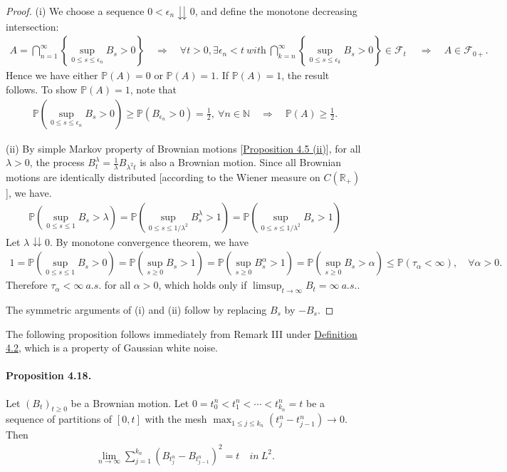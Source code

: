\documentclass{article}
\numberwithin{equation}{section}
\renewcommand{\P}{\mathbb{P}}
\theoremstyle{plain}
\theoremstyle{definition}
\begin{document}
\begin{proof}
(i) We choose a sequence $0<\epsilon_n\downdownarrows 0$, and define the monotone decreasing intersection:
\begin{align*}
	A = \bigcap_{n=1}^\infty\left\{\sup_{0\leq s\leq\epsilon_n}B_s>0\right\}\quad\Rightarrow\quad \forall t>0,\exists \epsilon_n<t\ \textit{with}\ \bigcap_{k=n}^\infty\left\{\sup_{0\leq s\leq\epsilon_k}B_s>0\right\}\in\mathscr{F}_t\ \quad\Rightarrow\quad A\in\mathscr{F}_{0+}.
\end{align*}
Hence we have either $\P(A)=0$ or $\P(A)=1$. If $\P(A)=1$, the result follows. To show $\P(A)=1$, note that
\begin{align*}
	\P\left(\sup_{0\leq s\leq\epsilon_n}B_s>0\right)\geq\P\left(B_{\epsilon_n}>0\right)=\frac{1}{2},\ \forall n\in\mathbb{N}\quad\Rightarrow\quad \P(A)\geq\frac{1}{2}.
\end{align*}

(ii) By simple Markov property of Brownian motions [\hyperref[prop:4.5]{Proposition 4.5 (ii)}], for all $\lambda>0$, the process $B_t^\lambda=\frac{1}{\lambda}B_{\lambda^2t}$ is also a Brownian motion. Since all Brownian motions are identically distributed [according to the Wiener measure on $C(\mathbb{R}_+)$], we have.
\begin{align*}
	\P\left(\sup_{0\leq s\leq 1}B_s > \lambda\right) = \P\left(\sup_{0\leq s\leq 1/\lambda^2}B_s^\lambda > 1\right) = \P\left(\sup_{0\leq s\leq 1/\lambda^2}B_s > 1\right)
\end{align*}
Let $\lambda\downdownarrows 0$. By monotone convergence theorem, we have
\begin{align*}
	1=\P\left(\sup_{0\leq s\leq 1}B_s > 0\right) = \P\left(\sup_{s\geq 0}B_s > 1\right) = \P\left(\sup_{s\geq 0}B_s^\alpha > 1\right)=\P\left(\sup_{s\geq 0}B_s > \alpha\right)\leq\P(\tau_\alpha<\infty),\quad \forall \alpha>0.
\end{align*}
Therefore $\tau_\alpha<\infty\ a.s.$ for all $\alpha>0$, which holds only if $\limsup_{t\to\infty} B_t=\infty\ a.s.$.

The symmetric arguments of (i) and (ii) follow by replacing $B_s$ by $-B_s$.
\end{proof}

The following proposition follows immediately from Remark III under \hyperref[def:4.2]{Definition 4.2}, which is a property of Gaussian white noise.

\paragraph{Proposition 4.18.\label{prop:4.18}} Let $(B_t)_{t\geq 0}$ be a Brownian motion. Let $0=t_0^n<t_1^n<\cdots<t_{k_n}^n=t$ be a sequence of partitions of $[0,t]$ with the mesh $\max_{1\leq j\leq k_n}(t_j^n-t_{j-1}^n)\to 0$. Then
\begin{align*}
	\lim_{n\to\infty}\sum_{j=1}^{k_n}(B_{t_j^n}-B_{t_{j-1}^n})^2 = t\quad \textit{in}\ L^2.
\end{align*}
\end{document}
